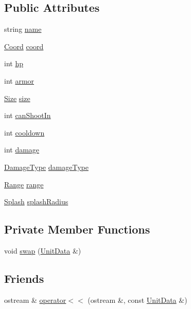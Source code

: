 \subsection*{Public Attributes}
\begin{DoxyCompactItemize}
\item 
string \hyperlink{structghost_1_1UnitData_a7ecbf48c9ed603fa864f275933b27b70}{name}
\item 
\hyperlink{structghost_1_1Coord}{Coord} \hyperlink{structghost_1_1UnitData_ab24b4e9dedcb50e80b42044bd866f5f1}{coord}
\item 
int \hyperlink{structghost_1_1UnitData_ab7e487e0851177e64723ba716d19e485}{hp}
\item 
int \hyperlink{structghost_1_1UnitData_af528321b4ba1e7d8cffa506c3d362487}{armor}
\item 
\hyperlink{namespaceghost_a2615b54cc16a8c95ffeeb246ad722833}{Size} \hyperlink{structghost_1_1UnitData_a36a08d9f1d0d9bd56e5595492b33a734}{size}
\item 
int \hyperlink{structghost_1_1UnitData_a2416df285073f4b94c3841fb36ad4bb3}{can\-Shoot\-In}
\item 
int \hyperlink{structghost_1_1UnitData_af3618bb67dd9903f51a5d9baba582cd6}{cooldown}
\item 
int \hyperlink{structghost_1_1UnitData_a08745f6321c0738e30588db95ce8c31f}{damage}
\item 
\hyperlink{namespaceghost_ab52582bfe39e47fc05f33770f38185d6}{Damage\-Type} \hyperlink{structghost_1_1UnitData_a635abb95369c4a1d1df106728d94e990}{damage\-Type}
\item 
\hyperlink{structghost_1_1Range}{Range} \hyperlink{structghost_1_1UnitData_a7951e942e15feab3c1854f869f7f5820}{range}
\item 
\hyperlink{structghost_1_1Splash}{Splash} \hyperlink{structghost_1_1UnitData_affa93d0c36e7a68193572acefb3fe4f3}{splash\-Radius}
\end{DoxyCompactItemize}
\subsection*{Private Member Functions}
\begin{DoxyCompactItemize}
\item 
void \hyperlink{structghost_1_1UnitData_a6b70ece5e3b54af1b6e7b6db9f9ac72e}{swap} (\hyperlink{structghost_1_1UnitData}{Unit\-Data} \&)
\end{DoxyCompactItemize}
\subsection*{Friends}
\begin{DoxyCompactItemize}
\item 
ostream \& \hyperlink{structghost_1_1UnitData_a865c338698e207b4c89141d9b25188f2}{operator$<$$<$} (ostream \&, const \hyperlink{structghost_1_1UnitData}{Unit\-Data} \&)
\end{DoxyCompactItemize}



